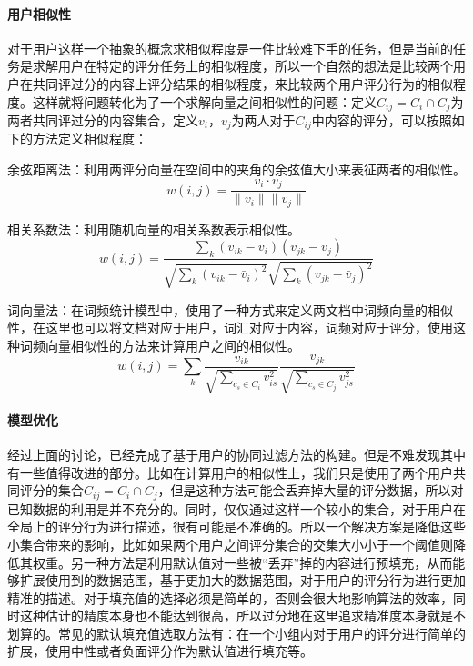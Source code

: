 \paragraph{用户相似性}
对于用户这样一个抽象的概念求相似程度是一件比较难下手的任务，但是当前的任务是求解用户在特定的评分任务上的相似程度，所以一个自然的想法是比较两个用户在共同评过分的内容上评分结果的相似程度，来比较两个用户评分行为的相似程度。这样就将问题转化为了一个求解向量之间相似性的问题：定义$C_{ij} = C_i \cap C_j$为两者共同评过分的内容集合，定义$v_i$，$v_j$为两人对于$C_{ij}$中内容的评分，可以按照如下的方法定义相似程度：

余弦距离法：利用两评分向量在空间中的夹角的余弦值大小来表征两者的相似性。
\begin{equation}
    w(i, j) = \frac{v_i \cdot v_j}{\|v_i\|\|v_j\|}
\end{equation}

相关系数法：利用随机向量的相关系数表示相似性\cite{CorrWeight}。
\begin{equation}
    w(i, j) = \frac{\sum_k (v_{ik} - \bar v_i)(v_{jk} - \bar v_j)}{\sqrt{\sum_k (v_{ik} - \bar v_i)^2} \sqrt{\sum_k (v_{jk} - \bar v_j)^2}}
\end{equation}

词向量法：在词频统计模型中，使用了一种方式来定义两文档中词频向量的相似性，在这里也可以将文档对应于用户，词汇对应于内容，词频对应于评分，使用这种词频向量相似性的方法来计算用户之间的相似性\cite{FreqVector}。
\begin{equation}
    w(i, j) = \sum_{k} \frac{v_{ik}}{\sqrt{\sum_{c_s \in C_i}v_{is}^2}} \frac{v_{jk}}{\sqrt{\sum_{c_s \in C_j}v_{js}^2}}
\end{equation}

\paragraph{模型优化}
经过上面的讨论，已经完成了基于用户的协同过滤方法的构建。但是不难发现其中有一些值得改进的部分。比如在计算用户的相似性上，我们只是使用了两个用户共同评分的集合$C_{ij} = C_{i} \cap C_{j}$，但是这种方法可能会丢弃掉大量的评分数据，所以对已知数据的利用是并不充分的\cite{CorrWeight}。同时，仅仅通过这样一个较小的集合，对于用户在全局上的评分行为进行描述，很有可能是不准确的。所以一个解决方案是降低这些小集合带来的影响，比如如果两个用户之间评分集合的交集大小小于一个阈值则降低其权重。另一种方法是利用默认值对一些被“丢弃”掉的内容进行预填充，从而能够扩展使用到的数据范围，基于更加大的数据范围，对于用户的评分行为进行更加精准的描述。对于填充值的选择必须是简单的，否则会很大地影响算法的效率，同时这种估计的精度本身也不能达到很高，所以过分地在这里追求精准度本身就是不划算的。常见的默认填充值选取方法有：在一个小组内对于用户的评分进行简单的扩展，使用中性或者负面评分作为默认值进行填充等\cite{DefaultVote}。

